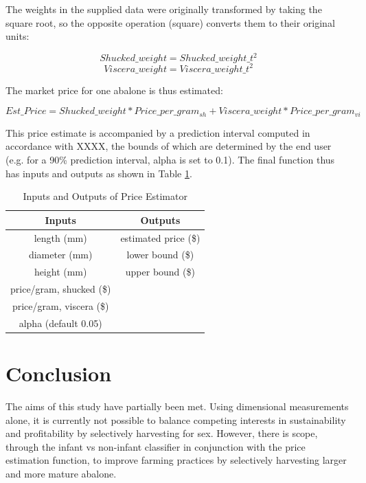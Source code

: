 \documentclass[11pt, a4paper]{article}
\begin{document}
    The weights in the supplied data were originally transformed by taking the square root, so the opposite operation (square) converts them to their original units:

    $$ Shucked\_weight = Shucked\_weight\_t ^ 2 $$
    $$ Viscera\_weight = Viscera\_weight\_t ^ 2 $$

    The market price for one abalone is thus estimated:

    $$ Est\_Price = Shucked\_weight * Price\_per\_gram_{sh} + Viscera\_weight * Price\_per\_gram_{vi} $$

    This price estimate is accompanied by a prediction interval computed in accordance with XXXX, the bounds of which are determined by the end user (e.g. for a 90\% prediction interval, alpha is set to 0.1). The final function thus has inputs and outputs as shown in Table \ref{function}.

    \begin{table}[ht]
        \centering
        \begin{tabular}{|c|c|}
            \hline
            Inputs & Outputs \\
            \hline
            length (mm) & estimated price (\$) \\
            diameter (mm) & lower bound (\$) \\
            height (mm) & upper bound (\$) \\
            price/gram, shucked (\$) & \\
            price/gram, viscera (\$) & \\
            alpha (default 0.05) & \\
            \hline
        \end{tabular}
        \caption{Inputs and Outputs of Price Estimator}
        \label{function}
    \end{table}

    \section*{Conclusion}

    The aims of this study have partially been met. Using dimensional measurements alone, it is currently not possible to balance competing interests in sustainability and profitability by selectively harvesting for sex. However, there is scope, through the infant vs non-infant classifier in conjunction with the price estimation function, to improve farming practices by selectively harvesting larger and more mature abalone.
\end{document}
